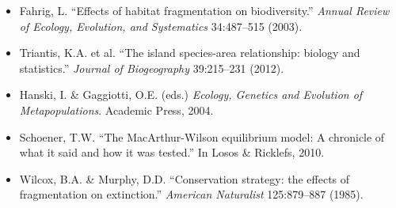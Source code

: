\documentclass[a4paper, 11pt]{article}
\begin{document}
\begin{itemize}
\item Fahrig, L. ``Effects of habitat fragmentation on biodiversity.'' \textit{Annual Review of Ecology, Evolution, and Systematics} 34:487--515 (2003).
\item Triantis, K.A. et al. ``The island species-area relationship: biology and statistics.'' \textit{Journal of Biogeography} 39:215--231 (2012).
\item Hanski, I. \& Gaggiotti, O.E. (eds.) \textit{Ecology, Genetics and Evolution of Metapopulations}. Academic Press, 2004.
\item Schoener, T.W. ``The MacArthur-Wilson equilibrium model: A chronicle of what it said and how it was tested.'' In Losos \& Ricklefs, 2010.
\item Wilcox, B.A. \& Murphy, D.D. ``Conservation strategy: the effects of fragmentation on extinction.'' \textit{American Naturalist} 125:879--887 (1985).
\end{itemize}
\end{document}
